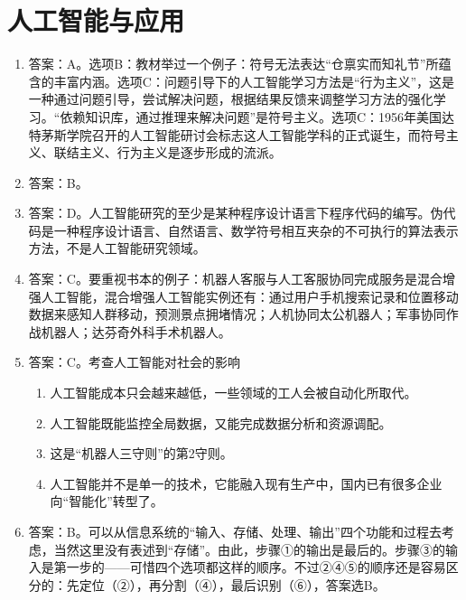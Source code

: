 \section{人工智能与应用}

\begin{enumerate}
\item 答案：A。选项B：教材举过一个例子：符号无法表达“仓禀实而知礼节”所蕴含的丰富内涵。选项C：问题引导下的人工智能学习方法是“行为主义”，这是一种通过问题引导，尝试解决问题，根据结果反馈来调整学习方法的强化学习。“依赖知识库，通过推理来解决问题”是符号主义。选项C：1956年美国达特茅斯学院召开的人工智能研讨会标志这人工智能学科的正式诞生，而符号主义、联结主义、行为主义是逐步形成的流派。

\item 答案：B。

\item 答案：D。人工智能研究的至少是某种程序设计语言下程序代码的编写。伪代码是一种程序设计语言、自然语言、数学符号相互夹杂的不可执行的算法表示方法，不是人工智能研究领域。

\item 答案：C。要重视书本的例子：机器人客服与人工客服协同完成服务是混合增强人工智能，混合增强人工智能实例还有：通过用户手机搜索记录和位置移动数据来感知人群移动，预测景点拥堵情况；人机协同太公机器人；军事协同作战机器人；达芬奇外科手术机器人。

\item 答案：C。考查人工智能对社会的影响
	\begin{enumerate}[label=\Alph*.]
	\item 人工智能成本只会越来越低，一些领域的工人会被自动化所取代。
	\item 人工智能既能监控全局数据，又能完成数据分析和资源调配。
	\item 这是“机器人三守则”的第2守则。
	\item 人工智能并不是单一的技术，它能融入现有生产中，国内已有很多企业向“智能化”转型了。
	\end{enumerate}

\item 答案：B。可以从信息系统的“输入、存储、处理、输出”四个功能和过程去考虑，当然这里没有表述到“存储”。由此，步骤①的输出是最后的。步骤③的输入是第一步的——可惜四个选项都这样的顺序。不过②④⑤的顺序还是容易区分的：先定位（②），再分割（④），最后识别（⑥），答案选B。


\end{enumerate}
